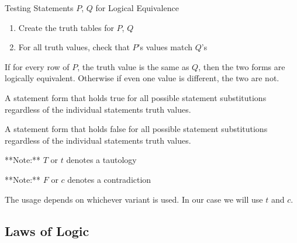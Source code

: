 \documentclass[11pt]{article}
\begin{document}
\large{Testing Statements $P$, $Q$ for Logical Equivalence}
\begin{enumerate}
    \item Create the truth tables for $P$, $Q$
    \item For all truth values, check that $P$'s values match $Q$'s
\end{enumerate}

If for every row of $P$, the truth value is the same as $Q$, then 
the two forms are logically equivalent. Otherwise if even one
value is different, the two are not.

\begin{definition}[Tautology]\label{def:tautology}
A statement form that holds true for all possible statement substitutions regardless of the individual statements truth values.
\end{definition}

\begin{definition}[Contradiction]\label{def:contradiction}
A statement form that holds false for all possible statement substitutions regardless of the individual statements truth values.
\end{definition}

\starON
**Note:** $T$ or $t$ denotes a tautology

**Note:** $F$ or $c$ denotes a contradiction

The usage depends on whichever variant is used. In our case we will use
$t$ and $c$.
\starOFF

\subsection{Laws of Logic}
\end{document}
